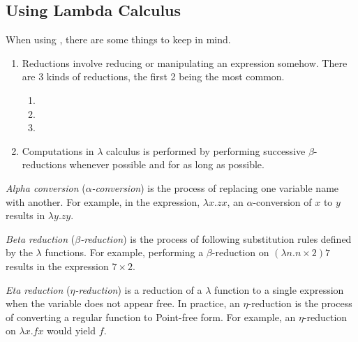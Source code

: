 \subsection{Using Lambda Calculus}\label{subsec:Using_Lambda_Calculus}
When using , there are some things to keep in mind.
\begin{enumerate}[noitemsep]
\item Reductions involve reducing or manipulating an expression somehow.
  There are 3 kinds of reductions, the first 2 being the most common.
  \begin{enumerate}[noitemsep]
  \item {}
  \item {}
  \item {}
  \end{enumerate}
\item Computations in $\lambda$ calculus is performed by performing successive $\beta$-reductions whenever possible and for as long as possible.
\end{enumerate}

\begin{definition}\label{def:Alpha_Conversion}
  \emph{Alpha conversion} (\emph{$\alpha$-conversion}) is the process of replacing one variable name with another.
  For example, in the expression, $\lambda x. zx$, an $\alpha$-conversion of $x$ to $y$ results in $\lambda y. zy$.
\end{definition}

\begin{definition}\label{def:Beta_Reduction}
  \emph{Beta reduction} (\emph{$\beta$-reduction}) is the process of following substitution rules defined by the $\lambda$ functions.
  For example, performing a $\beta$-reduction on $(\lambda n. n \times 2) 7$ results in the expression $7 \times 2$.
\end{definition}

\begin{definition}\label{def:Eta_Reduction}
  \emph{Eta reduction} (\emph{$\eta$-reduction}) is a reduction of a $\lambda$ function to a single expression when the variable does not appear free.
  In practice, an $\eta$-reduction is the process of converting a regular function to Point-free form.
  For example, an $\eta$-reduction on $\lambda x. f x$ would yield $f$.
\end{definition}

